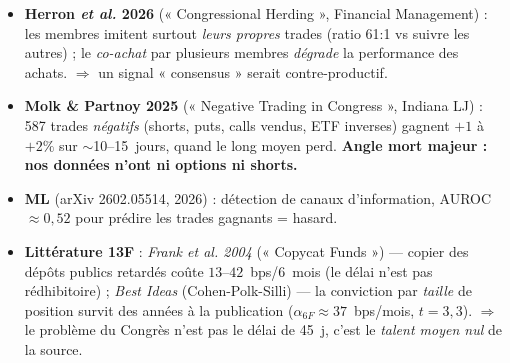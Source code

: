 \documentclass[11pt,a4paper]{article}
\begin{document}
\begin{itemize}
  \item \textbf{Herron \textit{et al.} 2026} (« Congressional Herding », Financial Management) : les membres
  imitent surtout \emph{leurs propres} trades (ratio 61:1 vs suivre les autres) ; le \emph{co-achat} par
  plusieurs membres \emph{dégrade} la performance des achats. $\Rightarrow$ un signal « consensus » serait
  contre-productif.
  \item \textbf{Molk \& Partnoy 2025} (« Negative Trading in Congress », Indiana LJ) : 587 trades
  \emph{négatifs} (shorts, puts, calls vendus, ETF inverses) gagnent $+1$ à $+2\%$ sur $\sim$10--15~jours,
  quand le long moyen perd. \textbf{Angle mort majeur : nos données n'ont ni options ni shorts.}
  \item \textbf{ML} (arXiv 2602.05514, 2026) : détection de canaux d'information, AUROC $\approx 0{,}52$
  pour prédire les trades gagnants = hasard.
  \item \textbf{Littérature 13F} : \emph{Frank \textit{et al.} 2004} (« Copycat Funds ») --- copier des
  dépôts publics retardés coûte $13$--$42$~bps/6~mois (le délai n'est pas rédhibitoire) ;
  \emph{Best Ideas} (Cohen-Polk-Silli) --- la conviction par \emph{taille} de position survit des années à la
  publication ($\alpha_{6F} \approx 37$~bps/mois, $t=3{,}3$). $\Rightarrow$ le problème du Congrès n'est pas
  le délai de 45~j, c'est le \emph{talent moyen nul} de la source.
\end{itemize}
\end{document}
